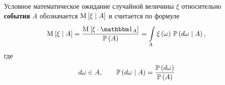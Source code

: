\begin{comment}
Тут уже уровень $H_k$ играет роль целого множества элементарных исходов,
его мера $\probability{H_k \mcond H_k}$ равна единице,
а мы получаем действительно среднее значение случайной величины $\eta$
на множестве $H_k$, умноженное на вероятность $\probability{H_k}$.
Значит, осталось лишь поделить обе части на $\probability{H_k}$
$$\frac{\Mean{ \eta \cdot \indicatorof{H_k} }}{\probability{H_k}}
      = \integrall{H_k}{\probability{d\omega \mcond H_k}}{
      \eta\left( \omega \right)}$$

\begin{definition}[Условное математическое ожидание случайной величины
  относительно случайного события]
  \label{eventConditionalExpectationDefinition}
  Условное математическое ожидание случайной величины $\xi$
  относительно \textbf{события} $A$ \cite[стр.~68]{BorovkovPT}
  обозначается $\Mean{\xi \mcond A}$ и считается по формуле
  $$\Mean{\xi \mcond A}
      = \frac{\Mean{\xi \cdot \indicatorof{A}}}{\probability{A}}
      = \integrall{A}{\probability{d\omega \mcond A}}{
      \xi\left( \omega \right)}$$
\end{definition}

Пользуясь только что введённым обозначением,
можно более красиво переписать формулу \eqref{discreteConditionalExpectation}
для получения проекции случайной величины $\eta$ на $\sigma$-алгебру,
порождённой уровнями $H_1, H_2, \dots, H_n$ 
$$\tilde{\eta}
  = \sum_{k=1}^n \Mean{ \eta \mcond H_k } \cdot \indicatorof{H_k}$$

Забегая наперёд,
введём определение частного случая условного математического ожидания
случайной величины относительно \textbf{$\sigma$-алгебры},
чтобы обратить внимание на этот важный момент.
\end{comment}
\begin{definition}
  \label{eventConditionalExpectationDefinition}
  Условное математическое ожидание случайной величины $\xi$
  относительно \textbf{события} $A$ \cite[стр.~68]{BorovkovPT}
  обозначается $\operatorname{M}_{} \left[ \xi \;\middle|\; A \right]$ и считается по формуле
  \begin{equation*}
    \Mean{\xi \mcond A}
      = \frac{\Mean{\xi \cdot \indicatorof{A}}}{\probability{A}}
      = \integrall{A}{\probability{d\omega \mcond A}}{
      \xi\left( \omega \right)},
  \end{equation*}
  где
  \begin{equation*}
    d\omega \in A,\qquad
    \mathbb{P}\left( d\omega \;\middle|\; A \right)
    = \frac{\mathbb{P}\left( d\omega \right)}{\mathbb{P}\left( A \right)}
  \end{equation*}
\end{definition}

